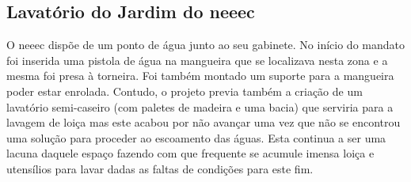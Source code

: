 \subsection{Lavatório do Jardim do \acrshort{neeec}}

O \acrshort{neeec} dispõe de um ponto de água junto ao seu gabinete. No início do mandato foi inserida uma pistola de água na mangueira que se localizava nesta zona e a mesma foi presa à torneira. Foi também montado um suporte para a mangueira poder estar enrolada. Contudo, o projeto previa também a criação de um lavatório semi-caseiro (com paletes de madeira e uma bacia) que serviria para a lavagem de loiça  mas este acabou por não avançar uma vez que não se encontrou uma solução para proceder ao escoamento das águas. Esta continua a ser uma lacuna daquele espaço fazendo com que frequente se acumule imensa loiça e utensílios para lavar dadas as faltas de condições para este fim.